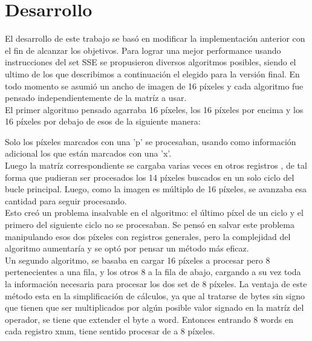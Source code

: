 \section{Desarrollo}

El desarrollo de este trabajo se bas\'o en modificar la implementaci\'on anterior con el fin de alcanzar los objetivos. Para lograr una mejor performance usando instrucciones del set SSE se propusieron diversos algoritmos posibles, siendo el ultimo de los que describimos a continuaci\'on el elegido para la versi\'on final. En todo momento se asumi\'o un ancho de imagen de 16 p\'ixeles y cada algoritmo fue pensado independientemente de la matr\'iz a usar.\\

El primer algoritmo pensado agarraba 16 p\'ixeles, los 16 p\'ixeles por encima y los 16 p\'ixeles por debajo de esos de la siguiente manera: \\


\vspace{0.5cm}

Solo los p\'ixeles marcados con una 'p' se procesaban, usando como informaci\'on adicional los que est\'an marcados con una 'x'. \\

Luego la matr\'iz correspondiente se cargaba varias veces en otros registros , de tal forma que pudieran ser procesados los 14 p\'ixeles buscados en un solo ciclo del bucle principal. Luego, como la imagen es m\'ultiplo de 16 p\'ixeles, se avanzaba esa cantidad para seguir procesando. \\

Esto cre\'o un problema insalvable en el algoritmo: el \'ultimo p\'ixel de un ciclo y el primero del siguiente ciclo no se procesaban. Se pens\'o en salvar este problema manipulando esos dos p\'ixeles con registros generales, pero la complejidad del algoritmo aumentar\'ia y se opt\'o por pensar un m\'etodo m\'as eficaz. \\


Un segundo algoritmo, se basaba en cargar 16 p\'ixeles a procesar
pero 8 pertenecientes a una fila, y los otros 8 a la fila de abajo, cargando a su vez toda la informaci\'on necesaria para procesar los dos set de 8 p\'ixeles. La ventaja de este m\'etodo esta en la simplificaci\'on de c\'alculos, ya que al tratarse de bytes sin signo que tienen que ser multiplicados por alg\'un posible valor signado en la matr\'iz del operador, se tiene que extender el byte a word. Entonces entrando 8 words en cada registro xmm, tiene sentido procesar de a 8 p\'ixeles. \\

